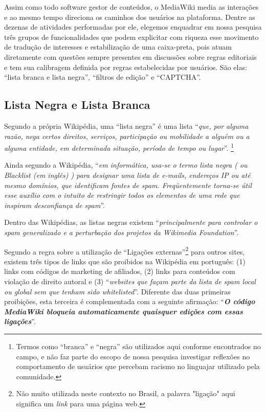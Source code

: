 Assim como todo software gestor de conteúdos, o MediaWiki media as interações e ao mesmo tempo direciona os caminhos dos usuários na plataforma. Dentre as dezenas de atividades performadas por ele, elegemos enquadrar em nossa pesquisa três grupos de funcionalidades que podem explicitar com riqueza esse movimento de tradução de interesses e estabilização de uma caixa-preta, pois atuam diretamente com questões sempre presentes em discussões sobre regras editoriais e tem sua calibragem definida por regras estabelecidas por usuários. São elas: ``lista branca e lista negra'', ``filtros de edição'' e ``CAPTCHA''.

\subsection{Lista Negra e Lista Branca}

Segundo a própria Wikipédia, uma ``lista negra'' é uma lista ``\textit{que, por alguma razão, nega certos direitos, serviços, participação ou mobilidade a alguém ou a alguma entidade, em determinada situação, período de tempo ou lugar}''. \footnote{Termos como ``branca'' e ``negra'' são utilizados aqui conforme encontrados no campo, e não faz parte do escopo de nossa pesquisa investigar reflexões no comportamento de usuários que percebam racismo no linguajar utilizado pela comunidade.}

Ainda segundo a Wikipédia, ``\textit{em informática, usa-se o termo lista negra ( ou Blacklist (em inglês) ) para designar uma lista de e-mails, endereços IP ou até mesmo domínios, que identificam fontes de spam. \textit{Freqüentemente} torna-se útil esse auxílio com o intuito de restringir todos os elementos de uma rede que inspiram desconfiança de spam}''.

Dentro das Wikipédias, as listas negras existem ``\textit{principalmente para controlar o spam generalizado e a perturbação dos projetos da Wikimedia Foundation}''. 

Segundo a regra sobre a utilização de ``Ligações externas''\footnote{Não muito utilizada neste contexto no Brasil, a palavra "ligação" aqui significa um \textit{link} para uma página web.} para outros sites, existem três tipos de links que são proibidos na Wikipédia em português: (1) links com códigos de marketing de afiliados, (2) links para conteúdos com violação de direito autoral e (3) ``\textit{websites que façam parte da lista de spam local ou global sem que tenham sido whitelisted}''. Diferente das duas primeiras proibições, esta terceira é complementada com a seguinte afirmação: ``\textbf{\textit{O código MediaWiki bloqueia automaticamente quaisquer edições com essas ligações}}''. 

